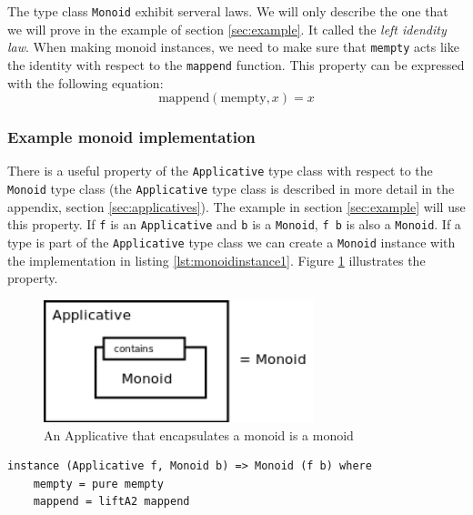 The type class \verb|Monoid| exhibit serveral laws. We will only describe the one that we will prove in the example of section \ref{sec:example}. It called the \emph{left idendity law}.
When making monoid instances, we need to make sure that \verb|mempty| acts like the identity with respect to the \verb|mappend| function. This property can be expressed with the following equation:
\begin{equation}
  \label{eq:firstmonoidlaw}
  \text{mappend}(\text{mempty}, x) = x
\end{equation}

\subsubsection{Example monoid implementation}

There is a useful property of the \verb|Applicative| type class with respect to the \verb|Monoid| type class (the \verb|Applicative| type class is described in more detail in the appendix, section \ref{sec:applicatives}). The example in section \ref{sec:example} will use this property. If \verb|f| is an \verb|Applicative| and \verb|b| is a \verb|Monoid|, \verb|f b| is also a \verb|Monoid|. If a type is part of the \verb|Applicative| type class we can create a \verb|Monoid| instance with the implementation in listing \ref{lst:monoidinstance1}. Figure \ref{fig:applicative_monoid} illustrates the property.

\begin{figure}
  \centering
     \includegraphics[width=0.7\textwidth]{monoid}
  \caption{An Applicative that encapsulates a monoid is a monoid}
  \label{fig:applicative_monoid}
\end{figure}

\lstset{
basicstyle=\ttfamily,
columns=fullflexible,
keepspaces=true,
}
\begin{lstlisting}[caption={Monoid instance implementation of applicatives},label={lst:monoidinstance1}]
instance (Applicative f, Monoid b) => Monoid (f b) where
    mempty = pure mempty
    mappend = liftA2 mappend
\end{lstlisting}

